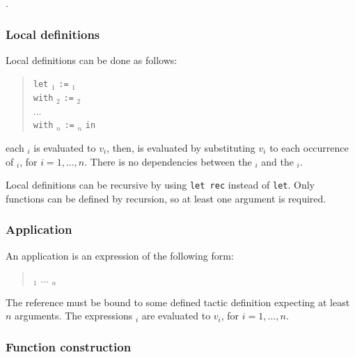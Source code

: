 \ErrMsg {}.

\subsubsection{Local definitions}

Local definitions can be done as follows:
\begin{quote}
{\tt let} {\ident}$_1$ {\tt :=} {\tacexpr}$_1$\\
{\tt with} {\ident}$_2$ {\tt :=} {\tacexpr}$_2$\\
...\\
{\tt with} {\ident}$_n$ {\tt :=} {\tacexpr}$_n$ {\tt in}\\
{\tacexpr}
\end{quote}
each {\tacexpr}$_i$ is evaluated to $v_i$, then, {\tacexpr} is
evaluated by substituting $v_i$ to each occurrence of {\ident}$_i$,
for $i=1,...,n$. There is no dependencies between the {\tacexpr}$_i$
and the {\ident}$_i$.

Local definitions can be recursive by using {\tt let rec} instead of
{\tt let}. Only functions can be defined by recursion, so at least one
argument is required.

\subsubsection{Application}

An application is an expression of the following form:
\begin{quote}
{\qualid} {\tacarg}$_1$ ... {\tacarg}$_n$
\end{quote}
The reference {\qualid} must be bound to some defined tactic
definition expecting at least $n$ arguments.  The expressions
{\tacexpr}$_i$ are evaluated to $v_i$, for $i=1,...,n$.


\subsubsection{Function construction}

